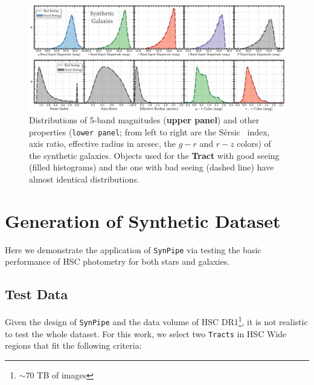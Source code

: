 \documentclass[useamsfonts]{pasj01}
\def\ser{{S\'{e}rsic\ }}
\def\synpipe{\texttt{SynPipe}}
\def\tracts{\texttt{Tracts}}
\begin{document}
\begin{figure}
    \begin{center}
        \includegraphics[width=\textwidth]{fig/synpipe_galaxy_sample}
    \end{center}
    \caption{
        Distributions of 5-band magnitudes (\textbf{upper panel}) and other properties 
        (\texttt{lower panel}; from left to right are the \ser{} index, axis ratio, 
        effective radius in arcsec, the $g-r$ and $r-z$ colors) of the synthetic 
        galaxies.
        Objects used for the \textbf{Tract} with good seeing (filled histograms) and 
        the one with bad seeing (dashed line) have almost identical distributions.
        }
    \label{fig:galaxy_sample}
\end{figure}

\section{Generation of Synthetic Dataset}
    \label{sec:test}
    
    Here we demonstrate the application of \synpipe{} via testing the basic performance 
    of HSC photometry for both stars and galaxies. 

\subsection{Test Data}

    Given the design of \synpipe{} and the data volume of HSC DR1\footnote{${\sim}70$ 
    TB of images}, it is not realistic to test the whole dataset. 
    For this work, we select two \tracts{} in HSC Wide regions 
    that fit the following criteria: 
    
\end{document}

